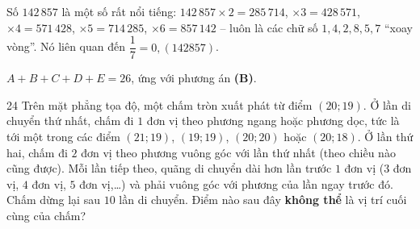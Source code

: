{\begin{tipbox}Số $142\,857$ là một số rất nổi tiếng: $142\,857\times 2=285\,714$, $\times 3=428\,571$, $\times 4=571\,428$, $\times 5=714\,285$, $\times 6=857\,142$ -- luôn là các chữ số $1,4,2,8,5,7$ ``xoay vòng''. Nó liên quan đến $\dfrac17=0{,}(142857)$.\end{tipbox}

$A+B+C+D+E=26$, ứng với phương án \textbf{(B)}.
}

\begin{probbox}{24}{\relax}
Trên mặt phẳng tọa độ, một chấm tròn xuất phát từ điểm $(20;19)$. Ở lần di chuyển thứ nhất, chấm đi $1$ đơn vị theo phương ngang hoặc phương dọc, tức là tới một trong các điểm $(21;19)$, $(19;19)$, $(20;20)$ hoặc $(20;18)$. Ở lần thứ hai, chấm đi $2$ đơn vị theo phương vuông góc với lần thứ nhất (theo chiều nào cũng được). Mỗi lần tiếp theo, quãng di chuyển dài hơn lần trước $1$ đơn vị ($3$ đơn vị, $4$ đơn vị, $5$ đơn vị,\dots) và phải vuông góc với phương của lần ngay trước đó. Chấm dừng lại sau $10$ lần di chuyển. Điểm nào sau đây \textbf{không thể} là vị trí cuối cùng của chấm?
\end{probbox}
